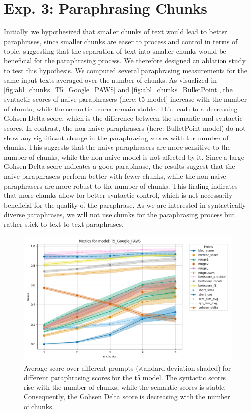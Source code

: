 \section{Exp. 3: Paraphrasing Chunks}

Initially, we hypothesized that smaller chunks of text would lead to better paraphrases, 
since smaller chunks are easer to process and control in terms of topic,
suggesting that the separation of text into smaller chunks would be beneficial for the paraphrasing process.
We therefore designed an ablation study to test this hypothesis.
We computed several paraphrasing measurements for the same input texts averaged over the number of chunks.
As visualized in \autoref{fig:abl_chunks_T5_Google_PAWS} and \autoref{fig:abl_chunks_BulletPoint},
the syntactic scores of naive paraphrasers (here: \ac{t5} model) increase with the number of chunks,
while the semantic scores remain stable.
This leads to a decreasing Gohsen Delta score, which is the difference between the semantic and syntactic scores.
In contrast, the non-naive paraphrasers (here: BulletPoint model) do not show any significant change in the paraphrasing scores with the number of chunks.
This suggests that the naive paraphrasers are more sensitive to the number of chunks, 
while the non-naive model is not affected by it.
Since a large Gohsen Delta score indicates a good paraphrase,
the results suggest that the naive paraphrasers perform better with fewer chunks, 
while the non-naive paraphrasers are more robust to the number of chunks.
This finding indicates that more chunks allow for better syntactic control, which is not necessarily beneficial for the quality of the paraphrase.
As we are interested in syntactically diverse paraphrases,
we will not use chunks for the paraphrasing process but rather stick to text-to-text paraphrases.
 
\begin{figure}[htbp]
    \centering
    \includegraphics[width=\textwidth]{images/paraphrasing/experiments/T5_Google_PAWS_metrics_plot.png}
    \caption{Average score over different prompts (standard deviation shaded) for different paraphrasing scores for the \ac{t5} model.
    The syntactic scores rise with the number of chunks, while the semantic scores is stable.
    Consequently, the Gohsen Delta score is decreasing with the number of chunks.}
    \label{fig:abl_chunks_T5_Google_PAWS}
\end{figure}

